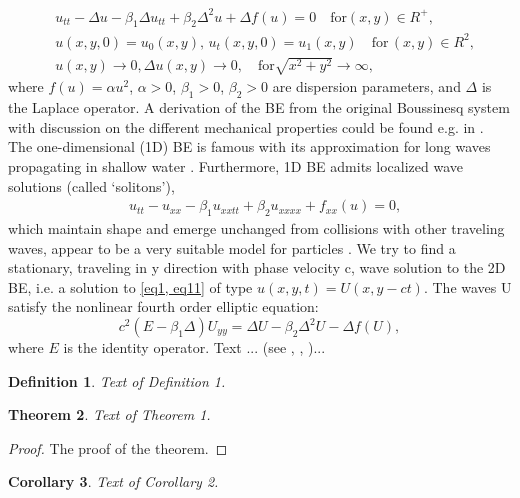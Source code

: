 \documentclass[12pt]{article}
\theoremstyle{theorem}
\newtheorem{theorem}{Theorem}
\newtheorem{corollary}[theorem]{Corollary}
\theoremstyle{defi}
\newtheorem{definition}[theorem]{Definition}
\begin{document}
\begin{align}
&u_{tt} - \Delta u -\beta_1  \Delta u_{tt} +\beta_2 \Delta ^2 u + \Delta f(u)=0 \quad \text{for} (x,y) \in R^{+} ,\label{eq1}
\\ \nonumber &u(x,y,0)=u_0(x,y), \, u_t(x,y,0)=u_1(x,y)   \quad\text{for} \, (x,y) \in R^2,
\\  &u(x,y) \rightarrow 0,  \Delta u(x,y) \rightarrow 0 ,  \quad \text{for}  \sqrt{x^2 + y^2} \rightarrow \infty, \label{eq11}
\end{align}
where   $f(u)=\alpha u^2$,  $\alpha>0$, $\beta_1>0$, $\beta_2>0$  are dispersion parameters, and $\Delta$ is the Laplace operator. A derivation of the BE from the original Boussinesq system with discussion on the different mechanical properties could be found e.g. in \cite{ref1}. 
The one-dimensional (1D) BE is famous with its approximation for long waves propagating in shallow water \cite{ref2, ref3}. Furthermore, 1D BE admits localized wave solutions (called ‘solitons’), 
\begin{align}
&u_{tt} - u_{xx} -\beta_1  u_{xxtt} +\beta_2 u_{xxxx} + f_{xx}(u) =0, \label{eq2}
\end{align}
which maintain shape and emerge unchanged from collisions with other traveling waves, appear to be a very suitable model for particles \cite{ref4, ref5}.
We try to find a stationary, traveling in y direction with phase velocity c, wave solution to the 2D BE, i.e. a solution to \ref{eq1, eq11} of type $u(x,y,t)=U(x,y - ct)$. The waves U satisfy the nonlinear fourth order elliptic equation:
\begin{equation}\label{eq2}
c^2 (E-\beta_1 \Delta) U_{yy} = \Delta U -\beta_2 \Delta^2 U - \Delta f(U),
\end{equation}
where $E$ is the identity operator. 
Text ... (see \cite{gasrah}, \cite{rosbl}, \cite{Moak})...


\begin{definition}
Text of Definition 1.
\end{definition}

\begin{theorem}
Text of Theorem 1.
\end{theorem}

\begin{proof}
The proof of the theorem.
\end{proof}

\begin{corollary}
Text of Corollary 2.
\end{corollary}
\end{document}
